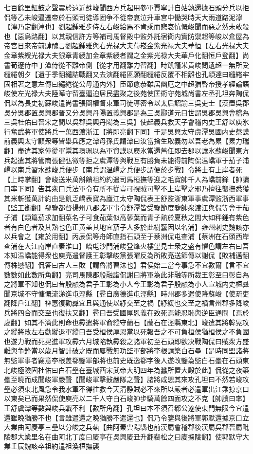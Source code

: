 七百餘里鉦鼓之聲震於遠近蘇峻聞西方兵起用參軍賈寧計自姑孰還據石頭分兵以拒侃等乙未峻逼遷帝於石頭司徒導固争不從帝哀泣升車宮中慟哭時天大雨道路泥濘【濘乃定翻淖也】劉超鍾雅步侍左右峻給馬不肯乘而悲哀忼慨峻聞而惡之然未敢殺也【惡烏路翻】以其親信許方等補司馬督殿中監外託宿衛内實防禦超等峻以倉屋為帝宮日來帝前肆醜言劉超鍾雅與右光禄大夫荀崧金紫光禄大夫華恒【左右光禄大夫金章紫綬光禄大夫銀章青綬加金章紫綬者謂之金紫光禄大夫華戶化翻恒戶登翻】尚書荀邃侍中丁潭侍從不離帝側【從才用翻離力智翻】時飢饉米貴峻問遺超一無所受繾綣朝夕【遺于季翻繾詰戰翻又去演翻綣區願翻繾綣反覆不相離也孔穎達曰繾綣牢固相著之意左傳曰繾綣從公毋通内外】臣節愈恭雖居幽厄之中超猶啓帝授孝經論語峻使左光禄大夫陸曄守留臺逼迫居民盡聚之後苑使匡術守苑城尚書左丞孔坦奔陶侃侃以為長史初蘇峻遣尚書張闓權督東軍司徒導密令以太后詔諭三吳吏士【漢置吳郡吳分吳郡置吳興郡晉又分吳興丹陽置義興郡是為三吳酈道元曰世謂吳郡吳興會稽為三吳杜佑曰晉宋之間以吳郡吳興丹陽為三吳】使起義兵救天子會稽内史王舒以庾氷行奮武將軍使將兵一萬西渡浙江【將即亮翻下同】于是吳興太守虞潭吳國内史蔡謨前義興太守顧衆等皆舉兵應之潭母孫氏謂潭曰汝當捨生取義勿以吾老為累【累力瑞翻】盡遣其家僮從軍鬻其環珮以為軍資謨以庾氷當還舊任即去郡以讓氷蘇峻聞東方兵起遣其將管商張健弘徽等拒之虞潭等與戰互有勝負未能得前陶侃温嶠軍于茄子浦嶠以南兵習水蘇峻兵便步【南兵謂温嶠之兵便步謂便於步戰】令將士有上岸者死【上時掌翻】會峻送米萬斛饋祖約約遣司馬桓撫等迎之毛寶帥千人為嶠前鋒【帥讀曰率下同】告其衆曰兵法軍令有所不從豈可視賊可擊不上岸擊之邪乃擅往襲撫悉獲其米斬獲萬計約由是飢乏嶠表寶為廬江太守陶侃表王舒監浙東軍事虞潭監浙西軍事【監工銜翻】郗鑒都督揚州八郡諸軍事令舒潭皆受鑒節度鑒帥衆渡江與侃等會于茄子浦【類篇茄求加翻菜名子可食茄葉似高蓼葉而青子熟於夏秋之間大如秤錘有紫色者有白色者及其熟也色正黄盖其地宜茄子人多於此樹藝因以名浦】雍州刺史魏該亦以兵會之【雍於用翻】丙辰侃等舟師直指石頭至于蔡洲侃屯查浦【蔡洲在石頭西岸查浦在大江南岸直秦淮口】嶠屯沙門浦峻登烽火樓望見士衆之盛有懼色謂左右曰吾本知温嶠能得衆也庾亮遣督護王彰擊峻黨張曜反為所敗亮送節傳以謝侃【敗補邁翻傳株戀翻】侃答曰古人三敗【謂魯將曹沬也】君侯始二當今事急不宜數爾【言不宜數數如此數所角翻】亮司馬陳郡殷融詣侃謝曰將軍為此非融等所裁王彰至曰彰自為之將軍不知也侃曰昔殷融為君子王彰為小人今王彰為君子殷融為小人宣城内史桓彛聞京城不守慷慨流涕進屯涇縣【彛自廣德進屯涇縣】時州郡多遣使降蘇峻【使疏吏翻降戶江翻】禆惠復勸彛宜且與通使以紓交至之禍【紓緩也交至之禍言州郡多降峻兵將四合而交至也復扶又翻】彛曰吾受國厚恩義在致死焉能忍恥與逆臣通問【焉於䖍翻】如其不濟此則命也彛遣將軍俞縱守蘭石【蘭石在涇縣東北】峻遣其將韓晃攻之縱將敗左右勸縱退軍縱曰吾受桓侯厚恩當以死報吾之不可負桓侯猶桓侯之不負國也遂力戰而死晃進軍攻彛六月城陷執彛殺之諸軍初至石頭即欲决戰陶侃曰賊衆方盛難與争鋒當以歲月智計破之既而屢戰無功監軍部將李根請築白石壘【是時同盟諸將無監軍事者竊意李根盖郗鑒軍部將也前史既逸郗字後人遂改鑒為監白石壘在石頭東北峻極險固杜佑曰白石壘在臺城西宋武帝大明四年為蠶所置大殿於此】侃從之夜築壘至曉而成聞峻軍嚴聲【聞峻軍擊鼔嚴隊之聲】諸將咸愳其來攻孔坦曰不然若峻攻壘必須東北風急令我水軍不得往救今天清静賊必不來所以嚴者必遣軍出江乘掠京口以東矣已而果然侃使庾亮以二千人守白石峻帥步騎萬餘四面攻之不克【帥讀曰率】王舒虞潭等數與峻兵戰不利【數所角翻】孔坦曰本不須召郗公遂使東門無限今宜遣還雖晩猶勝不也【言雖遣還之晚猶勝不遣還也】侃乃令鑒與後將軍郭默還據京口立大業曲阿庱亭三壘以分峻之兵埶【曲阿秦雲陽縣也前漢屬會稽郡後漢屬吳郡晉屬毗陵郡大業里名在曲阿北丁度曰庱亭在吳興庱丑升翻裴松之曰庱攄陵翻】使郭默守大業壬辰魏該卒祖約遣祖渙桓撫襲